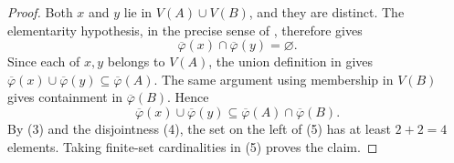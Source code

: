 \begin{proof}
Both $x$ and $y$ lie in $V(A)\cup V(B)$, and they are distinct.  The
elementarity hypothesis, in the precise sense of
, therefore gives
\[
             \overline\varphi(x)\cap\overline\varphi(y)
             =\varnothing.                                     \tag{4}
\]
Since each of $x,y$ belongs to $V(A)$, the union definition in
 gives
\(
 \overline\varphi(x)\cup\overline\varphi(y)
 \subseteq\overline\varphi(A)
\).
The same argument using membership in $V(B)$ gives containment in
$\overline\varphi(B)$.  Hence
\[
 \overline\varphi(x)\cup\overline\varphi(y)
 \subseteq
 \overline\varphi(A)\cap\overline\varphi(B).                   \tag{5}
\]
By (3) and the disjointness (4), the set on the left of (5) has at least
$2+2=4$ elements.  Taking finite-set cardinalities in (5) proves the
claim.
\end{proof}
